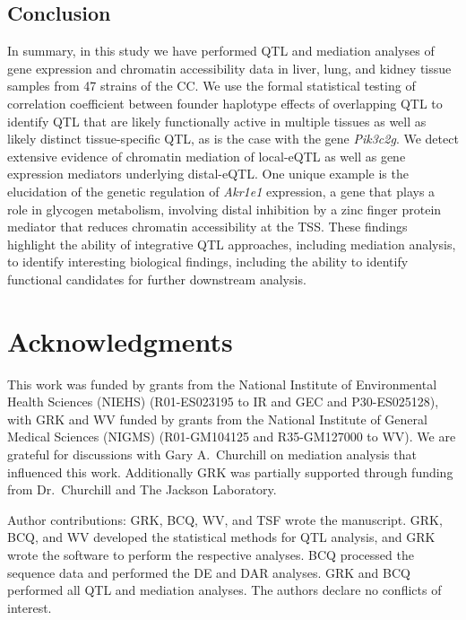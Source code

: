 \documentclass[9pt,twocolumn,twoside]{gsajnl}
\begin{document}
\subsection{Conclusion}

In summary, in this study we have performed QTL and mediation analyses of gene expression and chromatin accessibility data in liver, lung, and kidney tissue samples from 47 strains of the CC. We use the formal statistical testing of correlation coefficient between founder haplotype effects of overlapping QTL to identify QTL that are likely functionally active in multiple tissues as well as likely distinct tissue-specific QTL, as is the case with the gene \textit{Pik3c2g}. We detect extensive evidence of chromatin mediation of local-eQTL as well as gene expression mediators underlying distal-eQTL. One unique example is the elucidation of the genetic regulation of \textit{Akr1e1} expression, a gene that plays a role in glycogen metabolism, involving distal inhibition by a zinc finger protein mediator that reduces chromatin accessibility at the TSS. These findings highlight the ability of integrative QTL approaches, including mediation analysis, to identify interesting biological findings, including the ability to identify functional candidates for further downstream analysis.

\section{Acknowledgments}
This work was funded by grants from the National Institute of Environmental Health Sciences (NIEHS) (R01-ES023195 to IR and GEC and P30-ES025128), with GRK and WV funded by grants from the National Institute of General Medical Sciences (NIGMS) (R01-GM104125 and R35-GM127000 to WV). We are grateful for discussions with Gary A.\ Churchill on mediation analysis that influenced this work. Additionally GRK was partially supported through funding from Dr.\ Churchill and The Jackson Laboratory.

Author contributions: GRK, BCQ, WV, and TSF wrote the manuscript. GRK, BCQ, and WV developed the statistical methods for QTL analysis, and GRK wrote the software to perform the respective analyses. BCQ processed the sequence data and performed the DE and DAR analyses. GRK and BCQ performed all QTL and mediation analyses. The authors declare no conflicts of interest.



\clearpage
\end{document}
